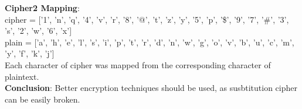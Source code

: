 \documentclass{exam}
\begin{document}
\textbf{Cipher2 Mapping}: \vspace{0.05in} \\
cipher = ['1', 'n', 'q', '4', 'v', 'r', '8', '@', 't', 'z', 'y', '5', 'p', '\$', '9', '7', '\#', '3', 's', '2', 'w', '6', 'x'] \vspace{0.05in} \\
plain = ['a', 'h', 'e', 'l', 's', 'i', 'p', 't', 'r', 'd', 'n', 'w', 'g', 'o', 'v', 'b', 'u', 'c', 'm', 'y', 'f', 'k', 'j'] \vspace{0.05in} \\
Each character of cipher was mapped from the corresponding character of plaintext. \vspace{0.05in} \\
\textbf{Conclusion}: Better encryption techniques should be used, as susbtitution cipher can be easily broken.
\end{document}
